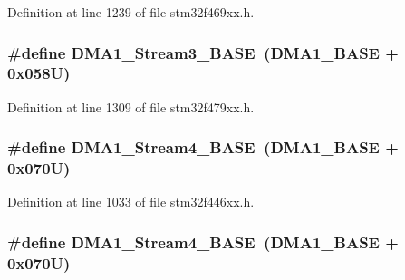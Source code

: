 Definition at line 1239 of file stm32f469xx.\+h.

\subsubsection[{\texorpdfstring{D\+M\+A1\+\_\+\+Stream3\+\_\+\+B\+A\+SE}{DMA1_Stream3_BASE}}]{\setlength{\rightskip}{0pt plus 5cm}\#define D\+M\+A1\+\_\+\+Stream3\+\_\+\+B\+A\+SE~({\bf D\+M\+A1\+\_\+\+B\+A\+SE} + 0x058\+U)}\hypertarget{group___peripheral__memory__map_gac51deb54ff7cfe1290dfcf517ae67127}{}\label{group___peripheral__memory__map_gac51deb54ff7cfe1290dfcf517ae67127}


Definition at line 1309 of file stm32f479xx.\+h.

\subsubsection[{\texorpdfstring{D\+M\+A1\+\_\+\+Stream4\+\_\+\+B\+A\+SE}{DMA1_Stream4_BASE}}]{\setlength{\rightskip}{0pt plus 5cm}\#define D\+M\+A1\+\_\+\+Stream4\+\_\+\+B\+A\+SE~({\bf D\+M\+A1\+\_\+\+B\+A\+SE} + 0x070\+U)}\hypertarget{group___peripheral__memory__map_ga757a3c0d866c0fe68c6176156065a26b}{}\label{group___peripheral__memory__map_ga757a3c0d866c0fe68c6176156065a26b}


Definition at line 1033 of file stm32f446xx.\+h.

\subsubsection[{\texorpdfstring{D\+M\+A1\+\_\+\+Stream4\+\_\+\+B\+A\+SE}{DMA1_Stream4_BASE}}]{\setlength{\rightskip}{0pt plus 5cm}\#define D\+M\+A1\+\_\+\+Stream4\+\_\+\+B\+A\+SE~({\bf D\+M\+A1\+\_\+\+B\+A\+SE} + 0x070\+U)}\hypertarget{group___peripheral__memory__map_ga757a3c0d866c0fe68c6176156065a26b}{}\label{group___peripheral__memory__map_ga757a3c0d866c0fe68c6176156065a26b}


